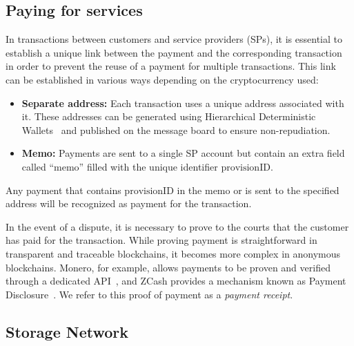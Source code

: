 \documentclass[pdftex,twocolumn,epjc3]{svjour3}
\begin{document}
\subsection{Paying for services}\label{payment-for-services}

\begin{sloppypar}
In transactions between customers and service providers (SPs), it is essential to establish a unique link between the payment and the corresponding transaction in order to prevent the reuse of a payment for multiple transactions. This link can be established in various ways depending on the cryptocurrency used:
\end{sloppypar}

\begin{sloppypar}
\begin{itemize}
    \item \textbf{Separate address:} Each transaction uses a unique address associated with it. These addresses can be generated using Hierarchical Deterministic Wallets~\cite{wuilleBIP32HierarchicalDeterministic2012} and published on the message board to ensure non-repudiation.
    \item \textbf{Memo:} Payments are sent to a single SP account but contain an extra field called ``memo'' filled with the unique identifier $\textrm{provisionID}$.
\end{itemize}
\end{sloppypar}

Any payment that contains $\textrm{provisionID}$ in the memo or is sent to the specified address will be recognized as payment for the transaction. 


\begin{sloppypar}
In the event of a dispute, it is necessary to prove to the courts that the customer has paid for the transaction. While proving payment is straightforward in transparent and traceable blockchains, it becomes more complex in anonymous blockchains. Monero, for example, allows payments to be proven and verified through a dedicated API~\cite{moneroHowProvePayment}, and ZCash provides a mechanism known as Payment Disclosure~\cite{daviesIntroductionPaymentDisclosure2017}. We refer to this proof of payment as a \textit{payment receipt}.
\end{sloppypar}

\subsection{Storage Network}\label{storage-network}
\end{document}
